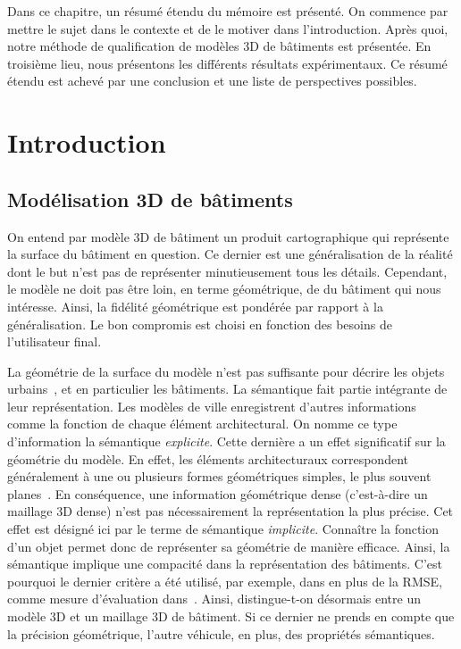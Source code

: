 
\vfill

Dans ce chapitre, un résumé étendu du mémoire est présenté.
On commence par mettre le sujet dans le contexte et de le motiver dans l'introduction.
Après quoi, notre méthode de qualification de modèles 3D de bâtiments est présentée.
En troisième lieu, nous présentons les différents résultats expérimentaux.
Ce résumé étendu est achevé par une conclusion et une liste de perspectives possibles.

\clearpage

\section*{Introduction}

    \subsection*{Modélisation 3D de bâtiments}
        On entend par modèle 3D de bâtiment un produit cartographique qui représente la surface du bâtiment en question.
        Ce dernier est une généralisation de la réalité dont le but n'est pas de représenter minutieusement tous les détails.
        Cependant, le modèle ne doit pas être loin, en terme géométrique, de du bâtiment qui nous intéresse.
        Ainsi, la fidélité géométrique est pondérée par rapport à la généralisation.
        Le bon compromis est choisi en fonction des besoins de l'utilisateur final.

        La géométrie de la surface du modèle n'est pas suffisante pour décrire les objets urbains~\parencite{biljecki2016improved}, et en particulier les bâtiments.
        La sémantique fait partie intégrante de leur représentation.
        Les modèles de ville enregistrent d'autres informations comme la fonction de chaque élément architectural.
        On nomme ce type d'information la sémantique \textit{explicite}.
        Cette dernière a un effet significatif sur la géométrie du modèle.
        En effet, les éléments architecturaux correspondent généralement à une ou plusieurs formes géométriques simples, le plus souvent planes~\parencite{kolbe2005citygml}.
        En conséquence, une information géométrique dense (c'est-à-dire un maillage 3D dense) n'est pas nécessairement la représentation la plus précise.
        Cet effet est désigné ici par le terme de sémantique \textit{implicite}.
        Connaître la fonction d'un objet permet donc de représenter sa géométrie de manière efficace.
        Ainsi, la sémantique implique une compacité dans la représentation des bâtiments.
        C'est pourquoi le dernier critère a été utilisé, par exemple, dans en plus de la RMSE, comme mesure d'évaluation dans~\parencite{lafarge2012creating}.
        Ainsi, distingue-t-on désormais entre un modèle 3D et un maillage 3D de bâtiment.
        Si ce dernier ne prends en compte que la précision géométrique, l'autre véhicule, en plus, des propriétés sémantiques.


